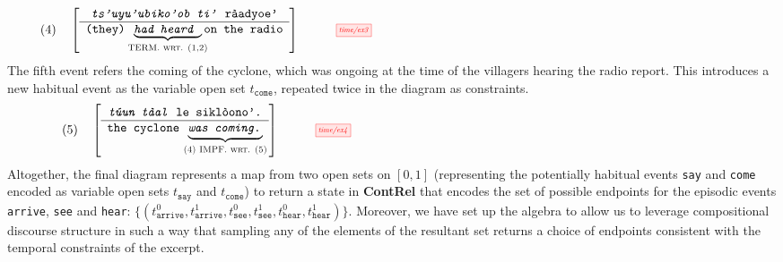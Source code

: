 \begin{example}
\[(4) \quad \left[ \begin{array}{c} \texttt{\emph{ts'uyu'ubiko'ob ti'} r\`{a}adyoe'} \\ \hline \texttt{(they) }\underbrace{\texttt{\emph{had heard }}}_{\textsc{\makebox[0pt]{TERM. wrt. (1,2)}}}\texttt{on the radio} \end{array} \right] \quad \vcenter{\scalebox{0.6}{\tikzfig{time/ex3}}}\]
The fifth event refers the coming of the cyclone, which was ongoing at the time of the villagers hearing the radio report. This introduces a new habitual event as the variable open set $t_\texttt{come}$, repeated twice in the diagram as constraints.
\[(5) \quad \left[ \begin{array}{c} \texttt{\emph{t\'{u}un t\`{a}al} le sikl\`{o}ono'.} \\ \hline \texttt{the cyclone }\underbrace{\texttt{\emph{was coming.}}}_{\textsc{\makebox[0pt]{(4) IMPF. wrt. (5)}}} \end{array} \right] \quad \vcenter{\scalebox{0.6}{\tikzfig{time/ex4}}}\]
Altogether, the final diagram represents a map from two open sets on $[0,1]$ (representing the potentially habitual events \texttt{say} and \texttt{come} encoded as variable open sets $t_\texttt{say}$ and $t_\texttt{come}$) to return a state in \textbf{ContRel} that encodes the set of possible endpoints for the episodic events \texttt{arrive}, \texttt{see} and \texttt{hear}: $\{(t_\texttt{arrive}^0,t_\texttt{arrive}^1,t_\texttt{see}^0,t_\texttt{see}^1,t_\texttt{hear}^0,t_\texttt{hear}^1)\}$. Moreover, we have set up the algebra to allow us to leverage compositional discourse structure in such a way that sampling any of the elements of the resultant set returns a choice of endpoints consistent with the temporal constraints of the excerpt.
\end{example}